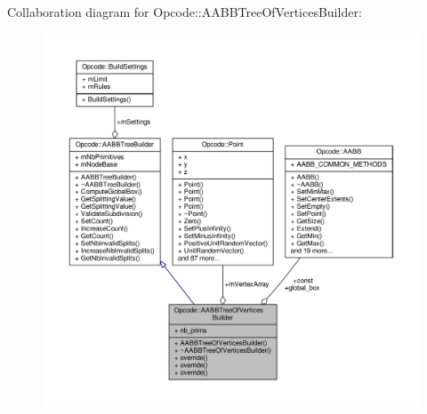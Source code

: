 Collaboration diagram for Opcode\+:\+:A\+A\+B\+B\+Tree\+Of\+Vertices\+Builder\+:
\nopagebreak
\begin{figure}[H]
\begin{center}
\leavevmode
\includegraphics[width=350pt]{d6/d5c/classOpcode_1_1AABBTreeOfVerticesBuilder__coll__graph}
\end{center}
\end{figure}
